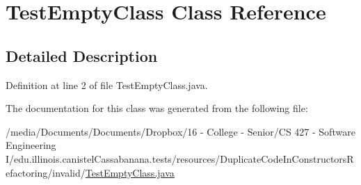\hypertarget{classTestEmptyClass}{
\section{TestEmptyClass Class Reference}
\label{classTestEmptyClass}
}


\subsection{Detailed Description}


Definition at line 2 of file TestEmptyClass.java.



The documentation for this class was generated from the following file:\begin{DoxyCompactItemize}
\item 
/media/Documents/Documents/Dropbox/16 -\/ College -\/ Senior/CS 427 -\/ Software Engineering I/edu.illinois.canistelCassabanana.tests/resources/DuplicateCodeInConstructorsRefactoring/invalid/\hyperlink{TestEmptyClass_8java}{TestEmptyClass.java}\end{DoxyCompactItemize}
